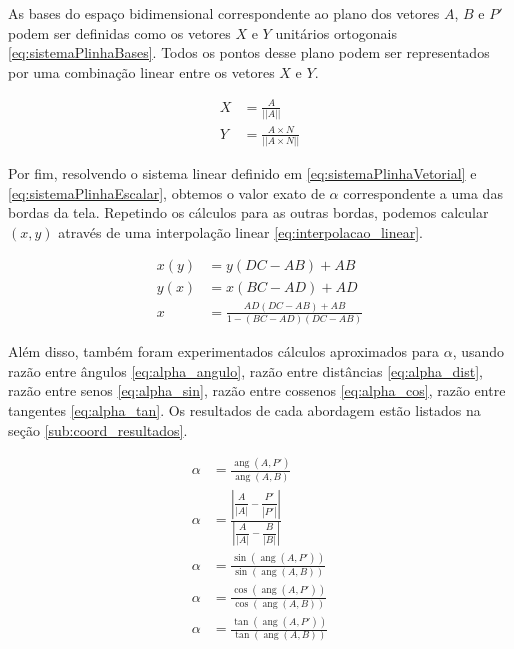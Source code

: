 \documentclass[brazil,pagestart=firstchapter]{abnt}
\DeclareMathOperator{\angulo}{ang}
\begin{document}
As bases do espaço bidimensional correspondente ao plano dos vetores $A$,
$B$ e $P'$ podem ser definidas como os vetores $X$ e $Y$ unitários
ortogonais \eqref{eq:sistemaPlinhaBases}. Todos os pontos desse plano podem
ser representados por uma combinação linear entre os vetores $X$ e $Y$.


\begin{align}
\label{eq:sistemaPlinhaBases}
X & = \frac{A}{ || A || }                     \\
Y & = \frac{A \times N}{ || A \times N || }   \nonumber
\end{align}

Por fim, resolvendo o sistema linear definido em
\eqref{eq:sistemaPlinhaVetorial} e \eqref{eq:sistemaPlinhaEscalar}, obtemos
o valor exato de $\alpha$ correspondente a uma das bordas da tela. Repetindo
os cálculos para as outras bordas, podemos calcular $(x,y)$ através de uma
interpolação linear \eqref{eq:interpolacao_linear}.

\begin{align}
\label{eq:interpolacao_linear}
x(y) & = y (DC - AB) + AB  \\
y(x) & = x (BC - AD) + AD  \nonumber \\
x    & = \frac{AD  (DC - AB) + AB}{1 - (BC - AD)  (DC - AB)}  \nonumber
\end{align}


Além disso, também foram experimentados cálculos aproximados para $\alpha$,
usando
razão entre ângulos \eqref{eq:alpha_angulo},
razão entre distâncias \eqref{eq:alpha_dist},
razão entre senos \eqref{eq:alpha_sin},
razão entre cossenos \eqref{eq:alpha_cos},
razão entre tangentes \eqref{eq:alpha_tan}.
Os resultados de cada abordagem estão listados na seção
\ref{sub:coord_resultados}.

\begin{align}
\label{eq:alpha_angulo}
\alpha & = \frac{\angulo(A, P')}{\angulo(A, B)} \\
\label{eq:alpha_dist}
\alpha & = \frac{
		\left| \dfrac{A}{|A|} - \dfrac{P'}{|P'|} \right|
	}{
		\left| \dfrac{A}{|A|} - \dfrac{B }{|B |} \right|
	}  \\
\label{eq:alpha_sin}
\alpha & = \frac{\sin(\angulo(A, P'))}{\sin(\angulo(A, B))} \\
\label{eq:alpha_cos}
\alpha & = \frac{\cos(\angulo(A, P'))}{\cos(\angulo(A, B))} \\
\label{eq:alpha_tan}
\alpha & = \frac{\tan(\angulo(A, P'))}{\tan(\angulo(A, B))}
\end{align}
\end{document}
